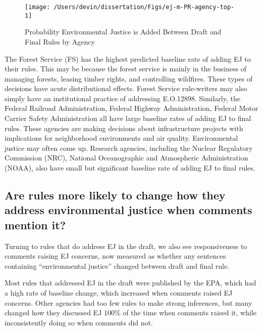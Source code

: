 \documentclass[
      12pt,
        ]{article}
\begin{document}
\begin{figure}

{\centering \texttt{[image: /Users/devin/dissertation/Figs/ej-m-PR-agency-top-1]} 

}

\caption{Probability Environmental Justice is Added Between Draft and Final Rules by Agency}\label{fig:ej-m-PR-agency-top}
\end{figure}

The Forest Service (FS) has the highest predicted baseline rate of adding EJ to their rules. This may be because the forest service is mainly in
the business of managing forests, leasing timber rights, and controlling
wildfires. These types of decisions have acute distributional
effects. Forest Service rule-writers may also simply have an institutional practice of addressing E.O.12898.
Similarly, the Federal
Railroad Administration, Federal Highway
Administration, Federal Motor Carrier Safety Administration all have large baseline rates of adding EJ to final rules. These agencies are
making decisions about infrastructure projects with implications for
neighborhood environments and air quality. Environmental justice may
often come up.
Research agencies, including the Nuclear Regulatory Commission (NRC), National Oceanographic and Atmospheric Administration (NOAA), also have small but significant baseline rate of adding EJ to final rules.

\hypertarget{are-rules-more-likely-to-change-how-they-address-environmental-justice-when-comments-mention-it}{%
\subsection{Are rules more likely to change how they address environmental justice when comments mention it?}\label{are-rules-more-likely-to-change-how-they-address-environmental-justice-when-comments-mention-it}}

Turning to rules that do address EJ in the draft, we also see responsiveness to comments raising EJ concerns, now measured as whether any sentences containing ``environmental justice'' changed between draft and final rule.

Most rules that addressed EJ in the draft were published by the EPA, which had a high rate of baseline change, which increased when comments raised EJ concerns. Other agencies had too few rules to make strong inferences, but many changed how they discussed EJ 100\% of the time when comments raised it, while inconsistently doing so when comments did not.
\end{document}
